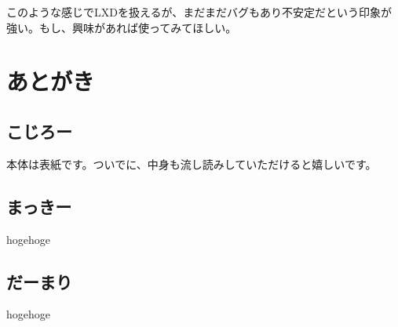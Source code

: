 \documentclass[9pt,b5paper,tombo]{jsbook}
\begin{document}
\noindent
このような感じでLXDを扱えるが、まだまだバグもあり不安定だという印象が強い。もし、興味があれば使ってみてほしい。

\chapter{あとがき}

\section{こじろー}
本体は表紙です。ついでに、中身も流し読みしていただけると嬉しいです。

\section{まっきー}

hogehoge

\section{だーまり}

hogehoge

\newpage


\enlargethispage{\paperwidth}
\thispagestyle{empty}
\vspace*{-1truein}
\vspace*{-\topmargin}
\vspace*{-\headheight}
\vspace*{-\headsep}
\vspace*{-\topskip}
\noindent\hspace*{-1in}\hspace*{-\oddsidemargin}
\end{document}
